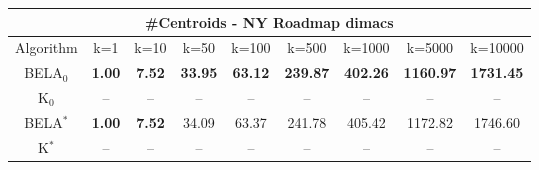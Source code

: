 \begin{tabular}{c|cccccccc}\toprule
\multicolumn{9}{c}{#Centroids - NY Roadmap dimacs}\\ \midrule
Algorithm & k=1 & k=10 & k=50 & k=100 & k=500 & k=1000 & k=5000 & k=10000 \\ \midrule
BELA$_0$ & \textbf{1.00} & \textbf{7.52} & \textbf{33.95} & \textbf{63.12} & \textbf{239.87} & \textbf{402.26} & \textbf{1160.97} & \textbf{1731.45} \\
K$_0$ & -- & -- & -- & -- & -- & -- & -- & -- \\
BELA$^*$ & \textbf{1.00} & \textbf{7.52} & 34.09 & 63.37 & 241.78 & 405.42 & 1172.82 & 1746.60 \\
K$^*$ & -- & -- & -- & -- & -- & -- & -- & -- \\ \bottomrule 
\end{tabular}
